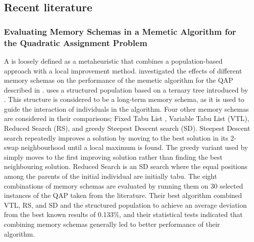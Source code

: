 \subsection{Recent literature} {
    \label{sec:approaches}




    \subsubsection*{Evaluating Memory Schemas in a Memetic Algorithm for the Quadratic Assignment Problem} {
        A  \citep{Neri:2012jr} is loosely defined as a metaheuristic that combines a population-based approach with a local improvement method.
    	\citet{Meneses:2011hg} investigated the effects of different memory schemas on the performance of the memetic algorithm for the QAP described in \citet{Inostroza:2008md}.
    	\citeauthor{Meneses:2011hg} uses a structured population based on a ternary tree introduced by \citet{Inostroza:2008md}. This structure is considered to be a long-term memory schema, as it is used to guide the interaction of individuals in the algorithm.
    	Four other memory schemas are considered in their comparisons; Fixed Tabu List \citep{glover1989tabu}, Variable Tabu List (VTL), Reduced Search (RS), and greedy Steepest Descent search (SD).
    	Steepest Descent search repeatedly improves a solution by moving to the best solution in its 2-swap neighbourhood until a local maximum is found. The greedy variant used by \citeauthor{Meneses:2011hg} simply moves to the first improving solution rather than finding the best neighbouring solution.
    	Reduced Search is an SD search where the equal positions among the parents of the initial individual are initially tabu.
    	The eight combinations of memory schemas are evaluated by running them on 30 selected instances of the QAP taken from the literature.
    	Their best algorithm combined VTL, RS, and SD and the structured population to achieve an average deviation from the best known results of 0.133\%, and their statistical tests indicated that combining memory schemas generally led to better performance of their algorithm.
    }



}
